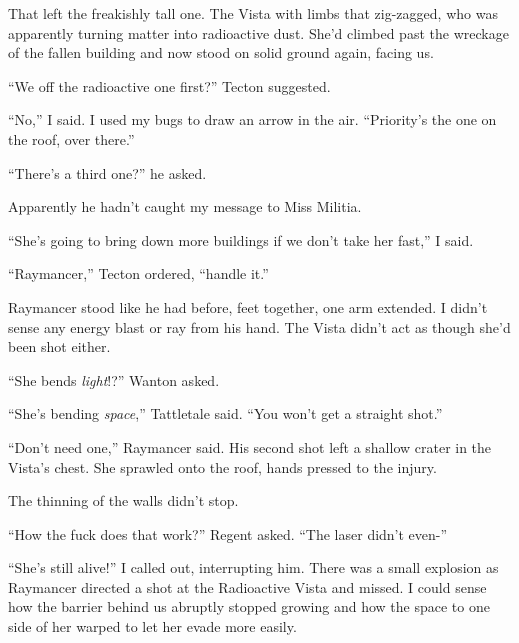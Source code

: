 That left the freakishly tall one.  The Vista with limbs that zig-zagged, who was apparently turning matter into radioactive dust.  She'd climbed past the wreckage of the fallen building and now stood on solid ground again, facing us.



``We off the radioactive one first?'' Tecton suggested.



``No,'' I said.  I used my bugs to draw an arrow in the air.  ``Priority's the one on the roof, over there.''



``There's a third one?'' he asked.



Apparently he hadn't caught my message to Miss Militia.



``She's going to bring down more buildings if we don't take her fast,'' I said.



``Raymancer,'' Tecton ordered, ``handle it.''



Raymancer stood like he had before, feet together, one arm extended.  I didn't sense any energy blast or ray from his hand.  The Vista didn't act as though she'd been shot either.



``She bends \emph{light}!?''  Wanton asked.



``She's bending \emph{space},'' Tattletale said.  ``You won't get a straight shot.''



``Don't need one,'' Raymancer said.  His second shot left a shallow crater in the Vista's chest.  She sprawled onto the roof, hands pressed to the injury.



The thinning of the walls didn't stop.



``How the fuck does that work?'' Regent asked.  ``The laser didn't even-''



``She's still alive!'' I called out, interrupting him.  There was a small explosion as  Raymancer directed a shot at the Radioactive Vista and missed.  I could sense how the barrier behind us abruptly stopped growing and how the space to one side of her warped to let her evade more easily.



